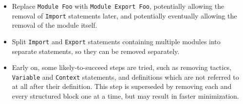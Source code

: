 \documentclass[a4paper,USenglish,cleveref,autoref,thm-restate]{lipics-v2021}
\begin{document}
\begin{enumerate}
\begin{enumerate}
\begin{itemize}
  \item Replace \verb|Module Foo| with \verb|Module Export Foo|, potentially allowing the removal of \verb|Import| statements later, and potentially eventually allowing the removal of the module itself.
  \item Split \verb|Import| and \verb|Export| statements containing multiple modules into separate statements, so they can be removed separately.
  \item Early on, some likely-to-succeed steps are tried, such as removing tactics, \verb|Variable| and \verb|Context| statements, and definitions which are not referred to at all after their definition.
    This step is superseded by removing each and every structured block one at a time, but may result in faster minimization.
  \end{itemize}
\end{enumerate}
\end{enumerate}
\end{document}

